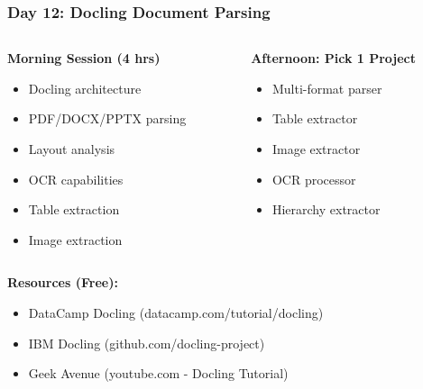 \begin{frame}[fragile]\frametitle{Day 12: Docling Document Parsing}
\begin{columns}
    \begin{column}[T]{0.5\linewidth}
      \textbf{Morning Session (4 hrs)}
      \begin{itemize}
        \item Docling architecture
        \item PDF/DOCX/PPTX parsing
        \item Layout analysis
        \item OCR capabilities
        \item Table extraction
        \item Image extraction
      \end{itemize}
    \end{column}
    \begin{column}[T]{0.5\linewidth}
      \textbf{Afternoon: Pick 1 Project}
      \begin{itemize}
        \item Multi-format parser
        \item Table extractor
        \item Image extractor
        \item OCR processor
        \item Hierarchy extractor
      \end{itemize}
    \end{column}
  \end{columns}
  
  \vspace{0.3cm}
  \textbf{Resources (Free):}
  \begin{itemize}
    \item DataCamp Docling (datacamp.com/tutorial/docling)
    \item IBM Docling (github.com/docling-project)
    \item Geek Avenue (youtube.com - Docling Tutorial)
  \end{itemize}
\end{frame}

